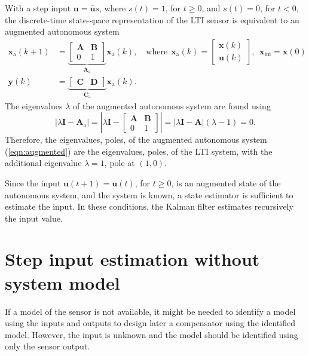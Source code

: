With a step input $\mathbf{u} = \bar{\mathbf{u}} s$, where $s(t) = 1$, for $t \geq 0$, and $s(t) = 0$, for $t < 0$, the discrete-time state-space representation of the LTI sensor is equivalent to an augmented autonomous system  
\begin{equation} \begin{aligned} \mathbf{x}_\text{a}(k+1) &= \underbrace{ \begin{bmatrix} \mathbf{A} & \mathbf{B} \\ 0 & 1 \end{bmatrix} }_{\mathbf{A}_\text{a}} \mathbf{x}_\text{a}(k) , \quad \text{where} \ \ \mathbf{x}_\text{a}(k) = \begin{bmatrix} \mathbf{x}(k) \\ \mathbf{u}(k) \end{bmatrix}, \ \ \mathbf{x}_{\text{ini}} = \mathbf{x}(0) \\
\mathbf{y}(k) &= \underbrace{ \begin{bmatrix} \mathbf{C} & \mathbf{D} \end{bmatrix} }_{\mathbf{C}_\text{a}} \mathbf{x}_\text{a}(k) . \label{eqn:augmented} \end{aligned} \end{equation}
The eigenvalues $\lambda$ of the augmented autonomous system are found using
\[ \left| \lambda \mathbf{I} - \mathbf{A}_\text{a} \right| = \left| \lambda \mathbf{I} - \begin{bmatrix} \mathbf{A} & \mathbf{B} \\ 0 & 1 \end{bmatrix} \right| = \left| \lambda \mathbf{I} - \mathbf{A} \right| \left( \lambda - 1 \right) = 0.\]
Therefore, the eigenvalues, poles, of the augmented autonomous system (\ref{eqn:augmented}) are the eigenvalues, poles, of the LTI system, with the additional eigenvalue $\lambda = 1$, pole at $(1,0)$.  

Since the input $\mathbf{u}(t+1) = \mathbf{u}(t)$, for $t \geq 0$, is an augmented state of the autonomous system, and the system is known, a state estimator is sufficient to estimate the input.
In these conditions, the Kalman filter estimates recursively the input value.  

\section{Step input estimation without system model}

If a model of the sensor is not available, it might be needed to identify a model using the inputs and outputs to design later a compensator using the identified model.
However, the input is unknown and the model should be identified using only the sensor output.

